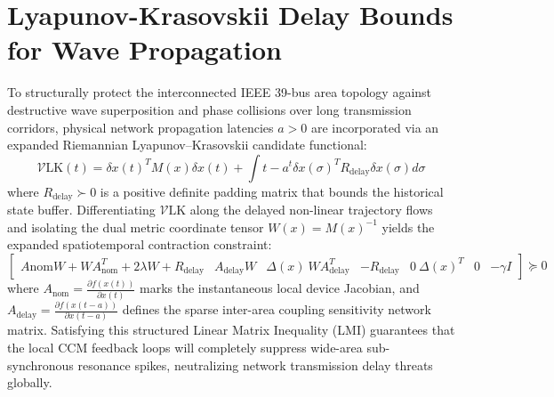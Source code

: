 \documentclass[10pt,journal,compsoc]{IEEEtran}
\begin{document}
\section{Lyapunov-Krasovskii Delay Bounds for Wave Propagation}
To structurally protect the interconnected IEEE 39-bus area topology against destructive wave superposition and phase collisions over long transmission corridors, physical network propagation latencies $a > 0$ are incorporated via an expanded Riemannian Lyapunov--Krasovskii candidate functional:
\begin{equation}
\mathcal{V}{\text{LK}}(t) = \delta x(t)^T M(x) \delta x(t) + \int{t-a}^{t} \delta x(\sigma)^T R_{\text{delay}} \delta x(\sigma) d\sigma
\end{equation}
where $R_{\text{delay}} \succ 0$ is a positive definite padding matrix that bounds the historical state buffer. Differentiating $\mathcal{V}{\text{LK}}$ along the delayed non-linear trajectory flows and isolating the dual metric coordinate tensor $W(x) = M(x)^{-1}$ yields the expanded spatiotemporal contraction constraint:
\begin{equation}
\begin{bmatrix}
A{\text{nom}}W + WA_{\text{nom}}^T + 2\lambda W + R_{\text{delay}} & A_{\text{delay}}W & \Delta(x) \
W A_{\text{delay}}^T & -R_{\text{delay}} & 0 \
\Delta(x)^T & 0 & -\gamma I
\end{bmatrix} \bm{\succeq} 0
\end{equation}
where $A_{\text{nom}} = \frac{\partial f(x(t))}{\partial x(t)}$ marks the instantaneous local device Jacobian, and $A_{\text{delay}} = \frac{\partial f(x(t-a))}{\partial x(t-a)}$ defines the sparse inter-area coupling sensitivity network matrix. Satisfying this structured Linear Matrix Inequality (LMI) guarantees that the local CCM feedback loops will completely suppress wide-area sub-synchronous resonance spikes, neutralizing network transmission delay threats globally.
\end{document}
